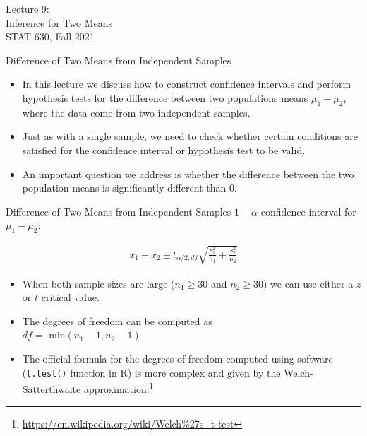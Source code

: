 \documentclass[10pt, fleqn]{beamer}
\begin{document}
\begin{frame}
\large
Lecture 9:\\
Inference for Two Means\\
STAT 630, Fall 2021
\normalsize
\end{frame}

\begin{frame}{Difference of Two Means from Independent Samples}
\begin{itemize}
\item In this lecture we discuss how to construct confidence intervals and perform hypothesis tests for the difference between two populations means $\mu_1 - \mu_2$, where the data come from two independent samples.
\vspace{10pt}
\item Just as with a single sample, we need to check whether certain conditions are satisfied for the confidence interval or hypothesis test to be valid. 
\vspace{10pt}
\item An important question we address is whether the difference between the two population means is significantly different than 0.
\end{itemize}
\end{frame}

\begin{frame}{Difference of Two Means from Independent Samples}
$1-\alpha$ confidence interval for $\mu_1 - \mu_2$:

\begin{align*}
\bar{x}_1 - \bar{x}_2 \pm t_{\alpha / 2; df} \sqrt{\frac{s_1^2}{n_1} + \frac{s_2^2}{n_2}}
\end{align*}

\small
\begin{itemize}
\item When both sample sizes are large ($n_1 \geq 30$ and $n_2 \geq 30$) we can use either a $z$ or $t$ critical value.
\item The degrees of freedom can be computed as\\ $df=$ min$(n_1-1, n_2-1)$  
\item The official formula for the degrees of freedom computed using software (\texttt{t.test()} function in R) is more complex and given by the Welch-Satterthwaite approximation.\footnote{\url{https://en.wikipedia.org/wiki/Welch\%27s_t-test}}
\end{itemize}
\end{frame}
\end{document}
